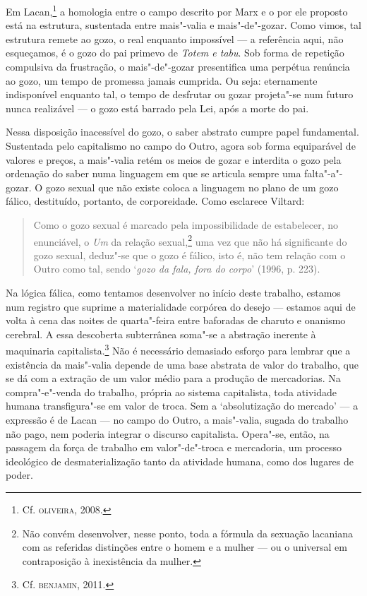 Em Lacan,\footnote{Cf. \textsc{oliveira}, 2008.} a homologia entre o campo
descrito por Marx e o por ele proposto está na estrutura, sustentada
entre mais"-valia e mais"-de"-gozar. Como vimos, tal estrutura remete ao
gozo, o real enquanto impossível --- a referência aqui, não esqueçamos, é
o gozo do pai primevo de \emph{Totem e tabu}. Sob forma de repetição
compulsiva da frustração, o mais"-de"-gozar presentifica uma perpétua
renúncia ao gozo, um tempo de promessa jamais cumprida. Ou seja:
eternamente indisponível enquanto tal, o tempo de desfrutar ou gozar
projeta"-se num futuro nunca realizável --- o gozo está barrado pela Lei,
após a morte do pai.

Nessa disposição inacessível do gozo, o saber abstrato cumpre papel
fundamental. Sustentada pelo capitalismo no campo do Outro, agora sob
forma equiparável de valores e preços, a mais"-valia retém os meios de
gozar e interdita o gozo pela ordenação do saber numa linguagem em que
se articula sempre uma falta"-a"-gozar. O gozo sexual que não existe
coloca a linguagem no plano de um gozo fálico, destituído, portanto, de
corporeidade. Como esclarece Viltard:

\begin{quote}
Como o gozo sexual é marcado pela impossibilidade de estabelecer, no
enunciável, o \emph{Um} da relação sexual,\footnote{Não convém
  desenvolver, nesse ponto, toda a fórmula da sexuação lacaniana com as
  referidas distinções entre o homem e a mulher --- ou o universal em
  contraposição à inexistência da mulher.} uma vez que não há
significante do gozo sexual, deduz"-se que o gozo é fálico, isto é, não
tem relação com o Outro como tal, sendo `\emph{gozo da fala, fora do
corpo}' (1996, p. 223).
\end{quote}

Na lógica fálica, como tentamos desenvolver no início deste trabalho,
estamos num registro que suprime a materialidade corpórea do desejo ---
estamos aqui de volta à cena das noites de quarta"-feira entre baforadas
de charuto e onanismo cerebral. A essa descoberta subterrânea soma"-se a
abstração inerente à maquinaria capitalista.\footnote{Cf. \textsc{benjamin}, 2011.} Não é necessário demasiado esforço para lembrar que a
existência da mais"-valia depende de uma base abstrata de valor do
trabalho, que se dá com a extração de um valor médio para a produção de
mercadorias. Na compra"-e"-venda do trabalho, própria ao sistema
capitalista, toda atividade humana transfigura"-se em valor de troca. Sem
a `absolutização do mercado' --- a expressão é de Lacan --- no campo do
Outro, a mais"-valia, sugada do trabalho não pago, nem poderia integrar o
discurso capitalista. Opera"-se, então, na passagem da força de trabalho
em valor"-de"-troca e mercadoria, um processo ideológico de
desmaterialização tanto da atividade humana, como dos lugares de poder.


